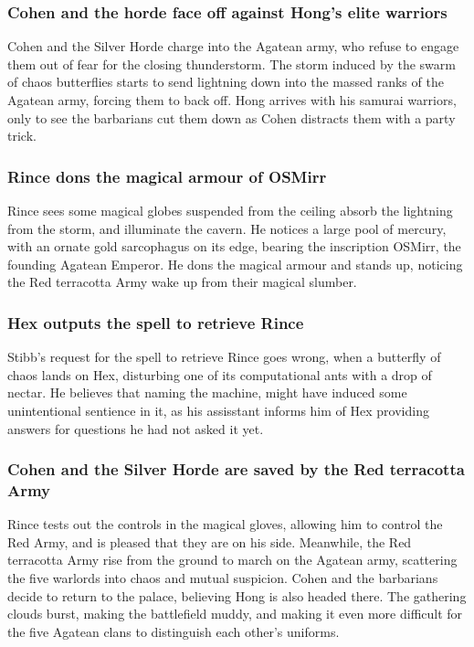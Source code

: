 \subsubsection{\Gls{Cohen} and the horde face off against \Gls{Hong}'s elite warriors}
\Gls{Cohen} and the Silver Horde charge into the Agatean army, who refuse to engage them out of
fear for the closing thunderstorm. The storm induced by the swarm of chaos butterflies starts to
send lightning down into the massed ranks of the Agatean army, forcing them to back off. \Gls{Hong}
arrives with his samurai warriors, only to see the barbarians cut them down as \Gls{Cohen}
distracts them with a party trick.

\subsubsection{\Gls{Rince} dons the magical armour of \Gls{OSMirr}}
\Gls{Rince} sees some magical globes suspended from the ceiling absorb the lightning from the storm,
and illuminate the cavern. He notices a large pool of mercury, with an ornate gold sarcophagus on
its edge, bearing the inscription \Gls{OSMirr}, the founding Agatean Emperor. He dons the magical
armour and stands up, noticing the Red terracotta Army wake up from their magical slumber.

\subsubsection{\Gls{Hex} outputs the spell to retrieve \Gls{Rince}}
\Gls{Stibb}'s request for the spell to retrieve \Gls{Rince} goes wrong, when a butterfly of chaos
lands on \Gls{Hex}, disturbing one of its computational ants with a drop of nectar. He believes that
naming the machine, might have induced some unintentional sentience in it, as his assisstant informs
him of \Gls{Hex} providing answers for questions he had not asked it yet.

\subsubsection{\Gls{Cohen} and the Silver Horde are saved by the Red terracotta Army}
\Gls{Rince} tests out the controls in the magical gloves, allowing him to control the Red Army, and
is pleased that they are on his side. Meanwhile, the Red terracotta Army rise from the ground to
march on the Agatean army, scattering the five warlords into chaos and mutual suspicion. \Gls{Cohen}
and the barbarians decide to return to the palace, believing \Gls{Hong} is also headed there. The
gathering clouds burst, making the battlefield muddy, and making it even more difficult for the
five Agatean clans to distinguish each other's uniforms.


